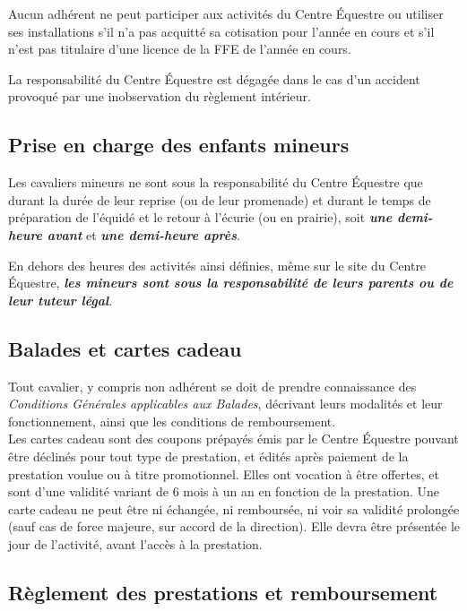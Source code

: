 \documentclass[11pt,a4paper]{article}
\begin{document}
Aucun adhérent ne peut participer aux activités du Centre Équestre ou utiliser ses installations s'il n'a pas acquitté sa cotisation pour l'année en cours et s'il n'est pas titulaire d'une licence de la FFE de l'année en cours.

La responsabilité du Centre Équestre est dégagée dans le cas d'un accident provoqué par une inobservation du règlement intérieur.

\subsection{Prise en charge des enfants mineurs}\label{subsec:prise-en-charge-des-enfants-mineurs}
Les cavaliers mineurs ne sont sous la responsabilité du Centre Équestre que durant la durée de leur reprise (ou de leur promenade) et durant le temps de préparation de l'équidé et le retour à l'écurie (ou en prairie), soit \textit{\textbf{une demi-heure avant}} et \textit{\textbf{une demi-heure après}}.

En dehors des heures des activités ainsi définies, même sur le site du Centre Équestre, \textit{\textbf{les mineurs sont sous la responsabilité de leurs parents ou de leur tuteur légal}}.

\subsection{Balades et cartes cadeau}\label{subsec:balades-et-cartes-cadeau}

Tout cavalier, y compris non adhérent se doit de prendre connaissance des \textit{Conditions Générales applicables aux Balades}, décrivant leurs modalités et leur fonctionnement, ainsi que les conditions de remboursement.
\\

Les \og cartes cadeau \fg{} sont des coupons prépayés émis par le Centre Équestre pouvant être déclinés pour tout type de prestation, et édités après paiement de la prestation voulue ou à titre promotionnel.
Elles ont vocation à être offertes, et sont d'une validité variant de 6 mois à un an en fonction de la prestation.
Une carte cadeau ne peut être ni échangée, ni remboursée, ni voir sa validité prolongée (sauf cas de force majeure, sur accord de la direction).
Elle devra être présentée le jour de l'activité, avant l'accès à la prestation.

\subsection{Règlement des prestations et remboursement}\label{subsec:reglement-des-prestations-et-remboursement}
\end{document}
